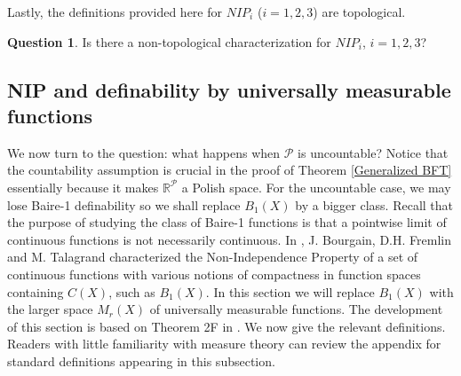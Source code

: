 \documentclass[psamsfonts]{amsart}
\theoremstyle{definition}
\newtheorem{question}[thm]{Question}
\theoremstyle{remark}
\numberwithin{equation}{section}
\begin{document}
\begin{center}
\end{center}

Lastly, the definitions provided here for $NIP_i$ ($i=1,2,3$) are topological.

\begin{question}
    Is there a non-topological characterization for $NIP_i$, $i=1,2,3$?
\end{question}

\subsection{NIP and definability by universally measurable functions}

We now turn to the question: what happens when $\mathcal{P}$ is uncountable? Notice that the countability assumption is crucial in the proof of Theorem \ref{Generalized BFT} essentially because it makes $\mathbb{R}^\mathcal{P}$ a Polish space. For the uncountable case, we may lose Baire-1 definability so we shall replace $B_1(X)$ by a bigger class. Recall that the purpose of studying the class of Baire-1 functions is that a pointwise limit of continuous functions is not necessarily continuous. In \cite{BFT_1978_PCompactBaire}, J. Bourgain, D.H. Fremlin and M. Talagrand characterized the Non-Independence Property of a set of continuous functions with various notions of compactness in function spaces containing $C(X)$, such as $B_1(X)$. In this section we will replace $B_1(X)$ with the larger space $M_r(X)$ of universally measurable functions. The development of this section is based on Theorem 2F in \cite{BFT_1978_PCompactBaire}. We now give the relevant definitions. Readers with little familiarity with measure theory can review the appendix for standard definitions appearing in this subsection.
\end{document}
